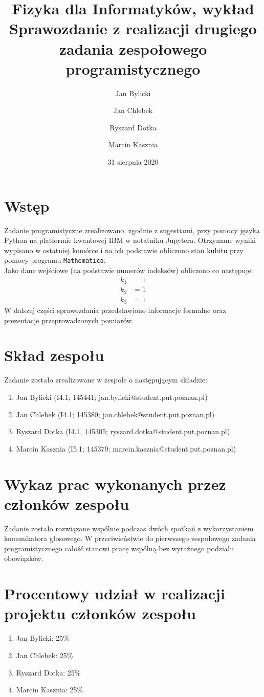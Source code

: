 \documentclass{article}
\title{Fizyka dla Informatyków, wykład\\ Sprawozdanie z realizacji drugiego zadania zespołowego programistycznego}
\author{Jan Bylicki \and Jan Chlebek \and Ryszard Dotka \and Marcin Kasznia}
\date{31 sierpnia 2020}
\begin{document}
\maketitle

\section{Wstęp}
Zadanie programistyczne zrealizowano, zgodnie z sugestiami, przy pomocy języka Python na platformie kwantowej IBM w notatniku Jupytera. Otrzymane wyniki wypisano w ostatniej komórce i na ich podstawie obliczono stan kubitu przy pomocy programu \verb+Mathematica+.\\
Jako dane wejściowe (na podstawie numerów indeksów) obliczono co następuje:
\begin{align*}
    k_1&=1\\
    k_2&=1\\
    k_3&=1
\end{align*}
W dalszej części sprawozdania przedstawiono informacje formalne oraz prezentacje przeprowadzonych pomiarów.

\section{Skład zespołu}
Zadanie zostało zrealizowane w zespole o następującym składzie:
\begin{enumerate}
    \item Jan Bylicki (I4.1; 145441; jan.bylicki@student.put.poznan.pl)
    \item Jan Chlebek (I4.1; 145380; jan.chlebek@student.put.poznan.pl)
    \item Ryszard Dotka (I4.1, 145305; ryszard.dotka@student.put.poznan.pl)
    \item Marcin Kasznia (I5.1; 145379; marcin.kasznia@student.put.poznan.pl)
\end{enumerate}

\section{Wykaz prac wykonanych przez członków zespołu}
    Zadanie zostało rozwiązane wspólnie podczas dwóch spotkań z wykorzystaniem komunikatora głosowego. W przeciwieństwie do pierwszego zespołowego zadania programistycznego całość stanowi pracę wspólną bez wyraźnego podziału obowiązków.
    

\section{Procentowy udział w realizacji projektu członków zespołu}
\begin{enumerate}
    \item Jan Bylicki: 25\%
    \item Jan Chlebek: 25\%
    \item Ryszard Dotka: 25\%
    \item Marcin Kasznia: 25\%
\end{enumerate}
\end{document}
